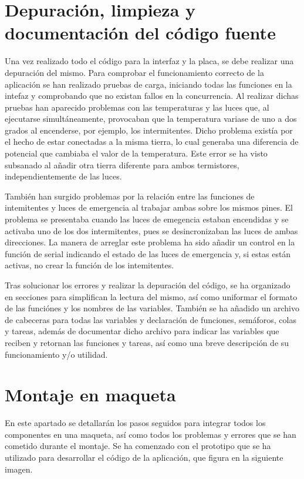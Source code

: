 \section{Depuración, limpieza y documentación del código fuente}

Una vez realizado todo el código para la interfaz y la placa, se debe realizar una depuración del mismo. Para comprobar el funcionamiento correcto de la aplicación se han realizado pruebas de carga, iniciando todas las funciones en la intefaz y comprobando que no existan fallos en la concurrencia. Al realizar dichas pruebas han aparecido problemas con las temperaturas y las luces que, al ejecutarse simultáneamente, provocaban que la temperatura variase de uno a dos grados al encenderse, por ejemplo, los intermitentes. Dicho problema existía por el hecho de estar conectadas a la misma tierra, lo cual generaba una diferencia de potencial que cambiaba el valor de la temperatura. Este error se ha visto subsanado al añadir otra tierra diferente para ambos termistores, independientemente de las luces. 

También han surgido problemas por la relación entre las funciones de intemitentes y luces de emergencia al trabajar ambas sobre los mismos pines. El problema se presentaba cuando las luces de emegencia estaban encendidas y se activaba uno de los dos intermitentes, pues se desincronizaban las luces de ambas direcciones. La manera de arreglar este problema ha sido añadir un control en la función de serial indicando el estado de las luces de emergencia y, si estas están activas, no crear la función de los intemitentes. 

Tras solucionar los errores y realizar la depuración del código, se ha organizado en secciones para simplifican la lectura del mismo, así como uniformar el formato de las funciónes y los nombres de las variables. También se ha añadido un archivo de cabeceras para todas las variables y declaración de funciones, semáforos, colas y tareas, además de documentar dicho archivo para indicar las variables que reciben y retornan las funciones y tareas, así como una breve descripción de su funcionamiento y/o utilidad. 


\section{Montaje en maqueta} 

En este apartado se detallarán los pasos seguidos para integrar todos los componentes en una maqueta, así como todos los problemas y errores que se han cometido durante el montaje. Se ha comenzado con el prototipo que se ha utilizado para desarrollar el código de la aplicación, que figura en la siguiente imagen.

